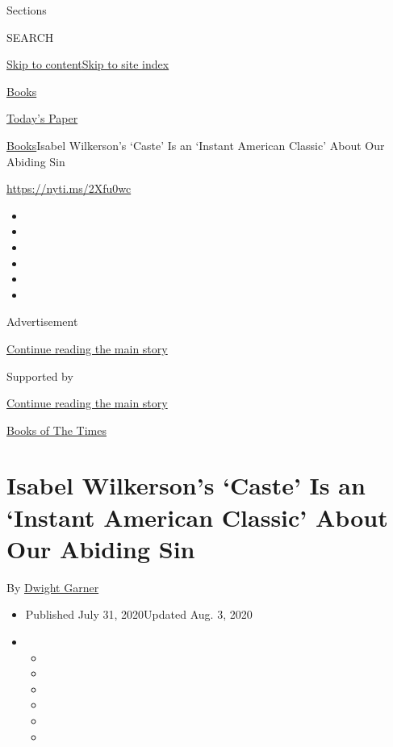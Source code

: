 Sections

SEARCH

\protect\hyperlink{site-content}{Skip to
content}\protect\hyperlink{site-index}{Skip to site index}

\href{https://www.nytimes3xbfgragh.onion/section/books}{Books}

\href{https://myaccount.nytimes3xbfgragh.onion/auth/login?response_type=cookie\&client_id=vi}{}

\href{https://www.nytimes3xbfgragh.onion/section/todayspaper}{Today's
Paper}

\href{/section/books}{Books}\textbar{}Isabel Wilkerson's `Caste' Is an
`Instant American Classic' About Our Abiding Sin

\url{https://nyti.ms/2Xfu0wc}

\begin{itemize}
\item
\item
\item
\item
\item
\item
\end{itemize}

Advertisement

\protect\hyperlink{after-top}{Continue reading the main story}

Supported by

\protect\hyperlink{after-sponsor}{Continue reading the main story}

\href{/column/books-of-the-times}{Books of The Times}

\hypertarget{isabel-wilkersons-caste-is-an-instant-american-classic-about-our-abiding-sin}{%
\section{Isabel Wilkerson's `Caste' Is an `Instant American Classic'
About Our Abiding
Sin}\label{isabel-wilkersons-caste-is-an-instant-american-classic-about-our-abiding-sin}}

By \href{https://www.nytimes3xbfgragh.onion/by/dwight-garner}{Dwight
Garner}

\begin{itemize}
\item
  Published July 31, 2020Updated Aug. 3, 2020
\item
  \begin{itemize}
  \item
  \item
  \item
  \item
  \item
  \item
  \end{itemize}
\end{itemize}

